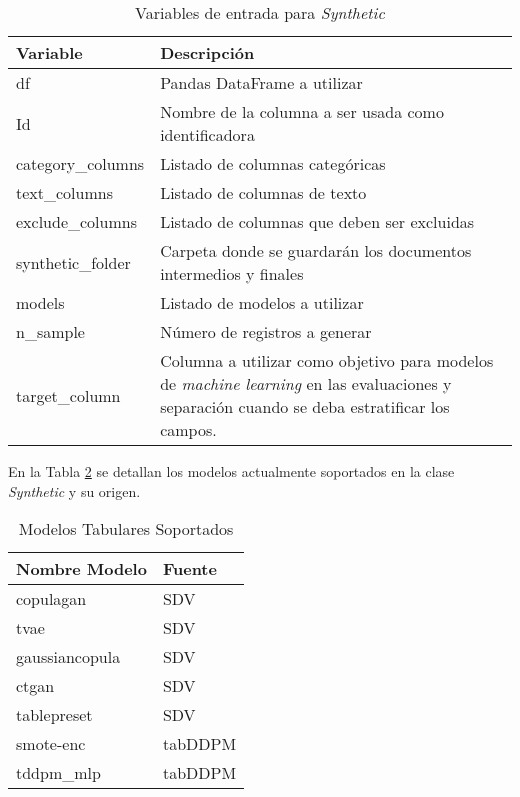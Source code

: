 \begin{table}[H]
\centering
\caption{Variables de entrada para \emph{Synthetic}}
\label{synthetic-input}
\begin{tabular}{|l|m{25em}|}
\hline
\rowcolor[gray]{0.8}
\textbf{Variable} & \textbf{Descripción} \\
\hline
df & Pandas DataFrame a utilizar \\
\hline
Id & Nombre de la columna a ser usada como identificadora \\
\hline
category\_columns & Listado de columnas categóricas \\
\hline
text\_columns & Listado de columnas de texto \\
\hline
exclude\_columns & Listado de columnas que deben ser excluidas \\
\hline
synthetic\_folder & Carpeta donde se guardarán los documentos intermedios y finales \\
\hline
models & Listado de modelos a utilizar \\
\hline
n\_sample & Número de registros a generar \\
\hline
target\_column & Columna a utilizar como objetivo para modelos de \emph{machine learning} en las evaluaciones y separación cuando se deba estratificar los campos. \\
\hline
\end{tabular}
\end{table}

En la Tabla \ref{modelos-tab-soportados} se detallan los modelos actualmente soportados en la clase \emph{Synthetic} y su origen.

\begin{table}[H]
	\centering
	\caption{Modelos Tabulares Soportados}
	\label{modelos-tab-soportados}
    \begin{tabular}{|l|l|}
        \hline
        \rowcolor[gray]{0.8}
        Nombre Modelo & Fuente \\
        \hline
        copulagan & SDV \cite{kotelnikov_overview_nodate} \\
        \hline
        tvae & SDV \cite{kotelnikov_overview_nodate} \\
        \hline
        gaussiancopula & SDV \cite{kotelnikov_overview_nodate} \\
        \hline
        ctgan & SDV \cite{kotelnikov_overview_nodate} \\
        \hline
        tablepreset & SDV \cite{kotelnikov_overview_nodate} \\
        \hline
        smote-enc & tabDDPM \cite{akim_tabddpm_2023} \\
        \hline
        tddpm\_mlp & tabDDPM \cite{akim_tabddpm_2023} \\
        \hline
      \end{tabular}        
\end{table} 

